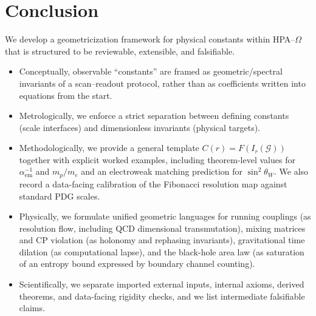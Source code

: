 \section{Conclusion}
\label{sec:conclusion}

We develop a geometricization framework for physical constants within HPA--$\Omega$ that is structured to be reviewable, extensible, and falsifiable.

\begin{itemize}
    \item Conceptually, observable ``constants'' are framed as geometric/spectral invariants of a scan--readout protocol, rather than as coefficients written into equations from the start.
    \item Metrologically, we enforce a strict separation between defining constants (scale interfaces) and dimensionless invariants (physical targets).
    \item Methodologically, we provide a general template $C(r)=F(I_r(\mathcal{G}))$ together with explicit worked examples, including theorem-level values for $\alpha_{\mathrm{em}}^{-1}$ and $m_p/m_e$ and an electroweak matching prediction for $\sin^2\theta_W$. We also record a data-facing calibration of the Fibonacci resolution map against standard PDG scales.
    \item Physically, we formulate unified geometric languages for running couplings (as resolution flow, including QCD dimensional transmutation), mixing matrices and CP violation (as holonomy and rephasing invariants), gravitational time dilation (as computational lapse), and the black-hole area law (as saturation of an entropy bound expressed by boundary channel counting).
    \item Scientifically, we separate imported external inputs, internal axioms, derived theorems, and data-facing rigidity checks, and we list intermediate falsifiable claims.
\end{itemize}
